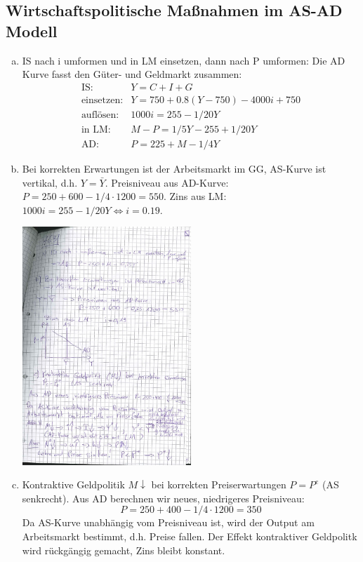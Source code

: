 \documentclass{scrartcl}
\begin{document}
\subsection{ Wirtschaftspolitische Ma{\ss}nahmen im AS-AD Modell}
\begin{enumerate}[a)]
  \item IS nach i umformen und in LM einsetzen, dann nach P umformen:
  Die AD Kurve fasst den G\"{u}ter- und Geldmarkt zusammen:
  \begin{align*}
    \text{IS}:& Y = C+ I + G\\
    \text{einsetzen}:& Y = 750 + 0.8(Y-750) - 4000 i +750\\
    \text{aufl\"{o}sen}:& 1000 i = 255 - 1/20 Y\\
    \text{in LM}:& M-P = 1/5 Y - 255 + 1/20 Y\\
    \text{AD}:& P = 225 + M - 1/4Y
  \end{align*}
  \item Bei korrekten Erwartungen ist der Arbeitsmarkt im GG, AS-Kurve ist vertikal, d.h. $Y=\bar{Y}$. Preisniveau aus AD-Kurve: $P=250+600-1/4 \cdot 1200 = 550$. Zins aus LM: $1000 i = 255 - 1/20 Y \Leftrightarrow i=0.19$.
  \begin{center}
  \includegraphics[width=0.5\textwidth]{Bilder/ASAD1.pdf}
  \end{center}
  \item Kontraktive Geldpolitik $M\downarrow$ bei korrekten Preiserwartungen $P=P^e$ (AS senkrecht). Aus AD berechnen wir neues, niedrigeres Preisniveau: $$ P = 250+400-1/4\cdot1200=350$$ Da AS-Kurve unabh\"{a}ngig vom Preisniveau ist, wird der Output am Arbeitsmarkt bestimmt, d.h. Preise fallen. Der Effekt kontraktiver Geldpolitk wird r\"{u}ckg\"{a}ngig gemacht, Zins bleibt konstant.\\

\end{enumerate}
\end{document}
